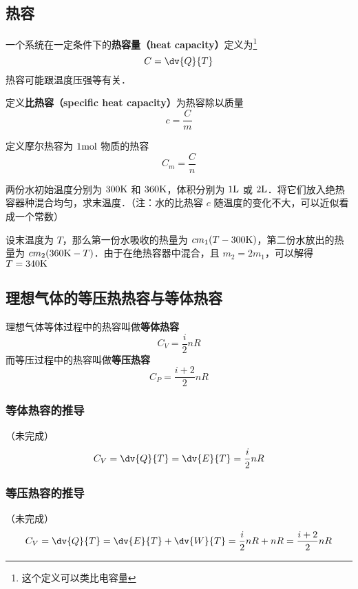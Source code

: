 
\begin{issues}
\issueTODO
\end{issues}

\subsection{热容}
一个系统在一定条件下的\textbf{热容量（heat capacity）}定义为\footnote{这个定义可以类比电容量}
\begin{equation}
C = \dv{Q}{T}
\end{equation}
热容可能跟温度压强等有关．

定义\textbf{比热容（specific heat capacity）}为热容除以质量
\begin{equation}
c = \frac{C}{m}
\end{equation}

定义摩尔热容为 $1 \rm{mol}$ 物质的热容
\begin{equation}
C_m=\frac{C}{n}
\end{equation}

\begin{example}{}
两份水初始温度分别为 $300\rm{K}$ 和 $360\rm{K}$，体积分别为 $1\rm{L}$ 或 $2 \rm{L}$．将它们放入绝热容器种混合均匀，求末温度．（注：水的比热容 $c$ 随温度的变化不大，可以近似看成一个常数）

设末温度为 $T$，那么第一份水吸收的热量为 $c m_1(T-300\rm{K})$，第二份水放出的热量为 $cm_2(360{\rm{K}}-T)$．由于在绝热容器中混合，且 $m_2=2m_1$，可以解得 $T=340\rm{K}$
\end{example}


\subsection{理想气体的等压热热容与等体热容}
理想气体等体过程中的热容叫做\textbf{等体热容}
\begin{equation}\label{ThCapa_eq1}
C_V = \frac{i}{2} n R
\end{equation}
而等压过程中的热容叫做\textbf{等压热容}
\begin{equation}\label{ThCapa_eq2}
C_P = \frac{i+2}{2} n R
\end{equation}

\subsubsection{等体热容的推导}
（未完成）
\begin{equation}
C_V = \dv{Q}{T} = \dv{E}{T} = \frac{i}{2} nR
\end{equation}

\subsubsection{等压热容的推导}
（未完成）
\begin{equation}
C_V = \dv{Q}{T} = \dv{E}{T} + \dv{W}{T} = \frac{i}{2} nR + nR = \frac{i+2}{2} nR
\end{equation}

